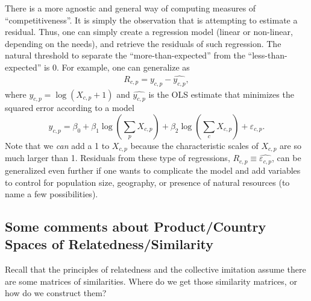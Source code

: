\documentclass[12pt]{article}
\begin{document}
There is a more agnostic and general way of computing measures of ``competitiveness''. It is simply the observation that  is attempting to estimate a residual. Thus, one can simply create a regression model (linear or non-linear, depending on the needs), and retrieve the residuals of such regression. The natural threshold to separate the ``more-than-expected'' from the ``less-than-expected'' is 0. For example, one can generalize  as
\begin{align}
	R_{c,p} = y_{c,p} - \widehat{y_{c,p}}, 
\end{align}
where $y_{c,p}=\log(X_{c,p}+1)$ and $\widehat{y_{c,p}}$ is the OLS estimate that minimizes the squared error according to a model $$y_{c,p} = \beta_0 + \beta_1\log(\sum_p X_{c,p}) + \beta_2\log(\sum_c X_{c,p}) + \varepsilon_{c,p}.$$ Note that we \emph{can} add a 1 to $X_{c,p}$ because the characteristic scales of $X_{c,p}$ are so much larger than 1. Residuals from these type of regressions, $R_{c,p}\equiv \widehat{\varepsilon_{c,p}}$, can be generalized even further if one wants to complicate the model and add variables to control for population size, geography, or presence of natural resources (to name a few possibilities).







\subsection{Some comments about Product/Country Spaces of Relatedness/Similarity}
Recall that the principles of relatedness and the collective imitation assume there are some matrices of similarities. Where do we get those similarity matrices, or how do we construct them?
\end{document}
